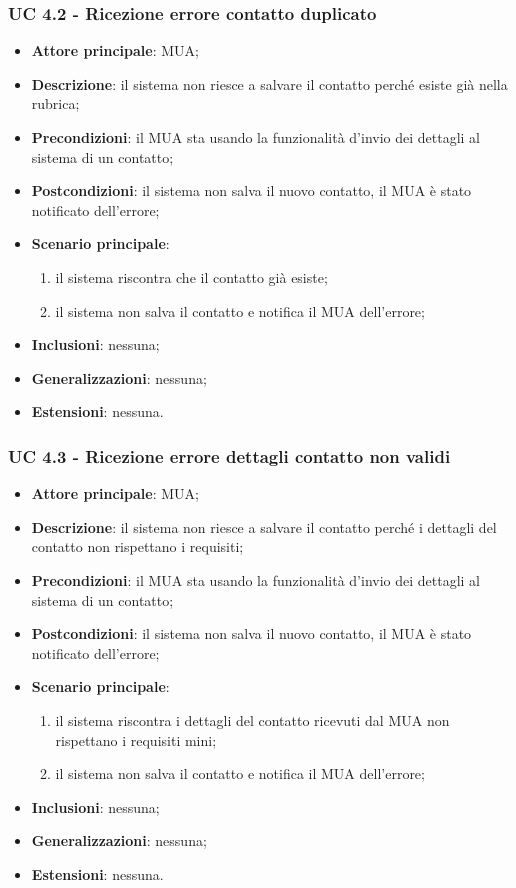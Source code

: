 \subsubsection{UC 4.2 - Ricezione errore contatto duplicato} \label{sec:UC4.2}
    \begin{itemize}
        \item \textbf{Attore principale}: MUA;
        \item \textbf{Descrizione}: il sistema non riesce a salvare il contatto perché esiste già nella rubrica;
        \item \textbf{Precondizioni}: il MUA sta usando la funzionalità d'invio dei dettagli al sistema di un contatto;
        \item \textbf{Postcondizioni}: il sistema non salva il nuovo contatto, il MUA è stato notificato dell'errore;
        \item \textbf{Scenario principale}:
            \begin{enumerate}
                \item il sistema riscontra che il contatto già esiste;
                \item il sistema non salva il contatto e notifica il MUA dell'errore;
            \end{enumerate}
        \item \textbf{Inclusioni}: nessuna;
        \item \textbf{Generalizzazioni}: nessuna;
        \item \textbf{Estensioni}: nessuna.
    \end{itemize}

\subsubsection{UC 4.3 - Ricezione errore dettagli contatto non validi} \label{sec:UC4.3}
    \begin{itemize}
        \item \textbf{Attore principale}: MUA;
        \item \textbf{Descrizione}: il sistema non riesce a salvare il contatto perché i dettagli del contatto non rispettano i requisiti;
        \item \textbf{Precondizioni}: il MUA sta usando la funzionalità d'invio dei dettagli al sistema di un contatto;
        \item \textbf{Postcondizioni}: il sistema non salva il nuovo contatto, il MUA è stato notificato dell'errore;
        \item \textbf{Scenario principale}:
            \begin{enumerate}
                \item il sistema riscontra i dettagli del contatto ricevuti dal MUA non rispettano i requisiti mini;
                \item il sistema non salva il contatto e notifica il MUA dell'errore;
            \end{enumerate}
        \item \textbf{Inclusioni}: nessuna;
        \item \textbf{Generalizzazioni}: nessuna;
        \item \textbf{Estensioni}: nessuna.
    \end{itemize}
